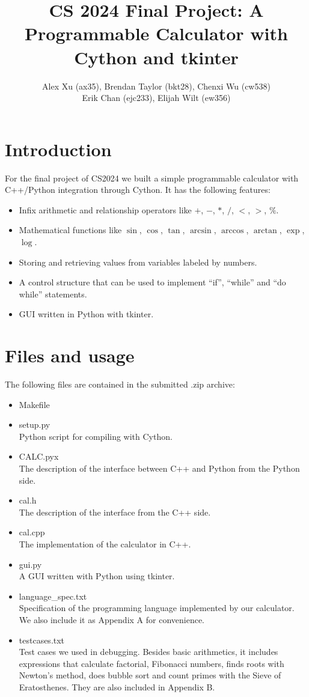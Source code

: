 \documentclass[]{article}
\title{CS 2024 Final Project: A Programmable Calculator with Cython and tkinter}
\author{Alex Xu (ax35), Brendan Taylor (bkt28), Chenxi Wu (cw538)\\ Erik Chan (ejc233), Elijah Wilt (ew356)}
\begin{document}
\maketitle

\section{Introduction}

For the final project of CS2024 we built a simple programmable calculator with C++/Python integration through Cython. It has the following features:
\begin{itemize}
	\item Infix arithmetic and relationship operators like $+$, $-$, $*$, $/$, $<$, $>$, $\%$.
	\item Mathematical functions like $\sin$, $\cos$, $\tan$, $\arcsin$, $\arccos$, $\arctan$, $\exp$, $\log$.
	\item Storing and retrieving values from variables labeled by numbers.
	\item A control structure that can be used to implement ``if'', ``while'' and ``do while'' statements.
	\item GUI written in Python with tkinter.
\end{itemize}

\section{Files and usage}

The following files are contained in the submitted .zip archive:
\begin{itemize}
	\item Makefile
	\item setup.py\\
	Python script for compiling with Cython.
	\item CALC.pyx\\
	The description of the interface between C++ and Python from the Python side.
	\item cal.h\\
	The description of the interface from the C++ side.
	\item cal.cpp\\
	The implementation of the calculator in C++.
	\item gui.py\\
	A GUI written with Python using tkinter.
	\item language\_spec.txt\\
	Specification of the programming language implemented by our calculator. We also include it as Appendix A for convenience.
	\item testcases.txt\\
	Test cases we used in debugging. Besides basic arithmetics, it includes expressions that calculate factorial, Fibonacci numbers, finds roots with Newton's method, does bubble sort and count primes with the Sieve of Eratosthenes.
	They are also included in Appendix B. 
\end{itemize}
\end{document}
